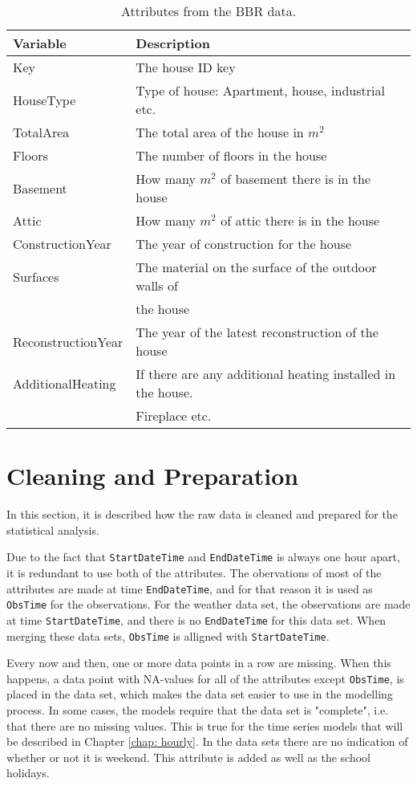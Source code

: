 \begin{table}[ht]
    \centering
    \begin{tabular}{ll}
     \hline
     \textbf{Variable} & \textbf{Description} \\
    \hline
    \hline
    Key  &  The house ID key\\
    HouseType  &  Type of house: Apartment, house, industrial etc. \\
    TotalArea  & The total area of the house in $m^2$ \\
    Floors  & The number of floors in the house \\
    Basement  & How many $m^2$ of basement there is in the house \\
    Attic  & How many $m^2$ of attic there is in the house \\
    ConstructionYear  & The year of construction for the house  \\
    Surfaces  & The material on the surface of the outdoor walls of \\ & the house \\
    ReconstructionYear  & The year of the latest reconstruction of the house \\
    AdditionalHeating  & If there are any additional heating installed in the house. \\ & Fireplace etc. \\
    \hline
    \end{tabular}
    \caption{Attributes from the BBR data.}
    \label{tab: BBR}
\end{table}

\section{Cleaning and Preparation}
In this section, it is described how the raw data is cleaned and prepared for the statistical analysis.

\noindent Due to the fact that \texttt{StartDateTime} and \texttt{EndDateTime} is always one hour apart, it is redundant to use both of the attributes. The obervations of most of the attributes are made at time \texttt{EndDateTime}, and for that reason it is used as \texttt{ObsTime} for the observations. For the weather data set, the observations are made at time \texttt{StartDateTime}, and there is no \texttt{EndDateTime} for this data set. When merging these data sets, \texttt{ObsTime} is alligned with \texttt{StartDateTime}. 

\noindent Every now and then, one or more data points in a row are missing. When this happens, a data point with NA-values for all of the attributes except \texttt{ObsTime}, is placed in the data set, which makes the data set easier to use in the modelling process. In some cases, the models require that the data set is "complete", i.e. that there are no missing values. This is true for the time series models that will be described in Chapter \ref{chap: hourly}. In the data sets there are no indication of whether or not it is weekend. This attribute is added as well as the school holidays.

